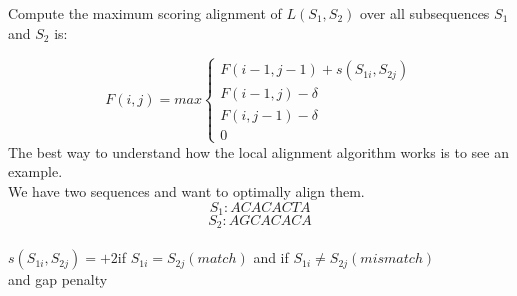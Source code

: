 \documentclass[11pt,a4paper]{report}
\begin{document}
Compute the maximum scoring alignment of $L(S_{1}, S_{2})$ over all subsequences $S_{1}$ and $S_{2}$ is:


\[ F(i,j)= max
\begin{cases}
   F(i-1,j-1) + s(S_{1i} , S_{2j})\\
   F(i-1 , j)- \delta\\
   F(i,j-1)- \delta\\
   0 \quad  
\end{cases}
\]
The best way to understand how the local alignment algorithm works is to see an example.\\

We have two sequences and want to optimally align them.
$$S_{1}:ACACACTA$$
$$S_{2}:AGCACACA$$\\
$s(S_{1i},S_{2j})= +2 $\quad if \quad $S_{1i} = S_{2j}(match)$ \quad and  \quad if \quad $ S_{1i}\neq S_{2j}(mismatch)$\\
and gap penalty 


 
  
\end{document}
